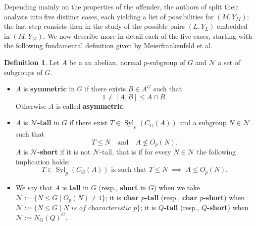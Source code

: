 \documentclass{amsart}
\numberwithin{equation}{section}
\theoremstyle{definition}
\newtheorem{definition}[equation]{Definition}
\theoremstyle{subresult}
\theoremstyle{caseresult}
\newcommand{\N}{\mathcal{N}}
\newcommand{\Syl}{\operatorname{Syl}}
\newcommand{\<}{\langle}
\renewcommand{\>}{\rangle}
\begin{document}
Depending mainly on the properties of the offender, the authors of \cite{Meier-Stell-Stroth:2012} split their analysis into five distinct cases, each yielding a list of possibilities for $(M,Y_M)$: the last step consists then in the study of the possible pairs $(L,Y_L)$ embedded in $(M,Y_M)$. We now describe more in detail each of the five cases, starting with the following fundamental definition given by Meierfrankenfeld et al.

\begin{definition}\label{def:symm-tall-groups}
	Let $A$ be a an abelian, normal $p$-subgroup of $G$ and $\N$ a set of subgroups of $G$.
	\begin{itemize}
		\item $A$ is {\bf symmetric} in $G$ if there exists $B \in A^G$ such that
			\[
			1 \ne [A,B] \le A \cap B.
			\]
			Otherwise $A$ is called {\bf asymmetric}.
		\item $A$ is {\bf $\N$-tall} in $G$ if there exist $T \in \Syl_p(C_G(A))$ and a subgroup $N 
			\in	\N$ such that
			\[
			T \le N \quad \text{and} \quad A \not \le O_p(N).
			\]
			$A$ is {\bf $\N$-short} if it is not $\N$-tall, that is if for every $N \in \N$ the following implication holds:
			\[
			T \in \Syl_p(C_G(A)) \text{ is such that } T \le N \; \implies \; A \le O_p(N).
			\]
		\item We say that $A$ is {\bf tall} in $G$ (resp., {\bf short} in $G$) when we take $\N := \{ N \le G \mid O_p(N) \ne 1 \}$; it is {\bf char $p$-tall} (resp., {\bf char $p$-short}) when $\N := \{N \le G \mid \textit{N is of characteristic $p$} \}$; it is {\bf $Q$-tall} (resp., {\bf $Q$-short}) when $\N := N_G(Q)^G$.
	\end{itemize}
\end{definition}
\end{document}
